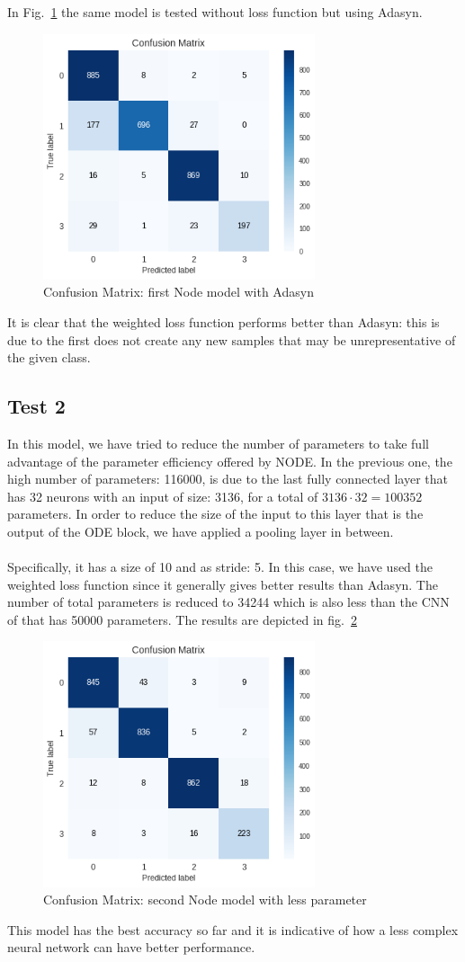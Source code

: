 \documentclass[LaM,binding=0.6cm]{sapthesis}
\begin{document}
In Fig.~\ref{fig:odetestada} the same model is tested without loss function but using Adasyn.
\begin{figure}   \centering
    \includegraphics[width=80mm,scale=0.7]{odetestada.png}
    \caption{Confusion Matrix: first Node model with Adasyn}
    \label{fig:odetestada}
\end{figure}
It is clear that the weighted loss function performs better than Adasyn: this is due to the first does not create any new samples that may be unrepresentative of the given class. 
\subsection{Test 2}
In this model, we have tried to reduce the number of parameters to take full advantage of the parameter efficiency offered by NODE. In the previous one, the high number of parameters: 116000, is due to the last fully connected layer that has 32 neurons with an input of size: 3136, for a total of $3136 \cdot 32 = 100352$ parameters. In order to reduce the size of the input to this layer that is the output of the ODE block, we have applied a pooling layer in between.\\\\Specifically, it has a size of 10 and as stride: 5. In this case, we have used the weighted loss function since it generally gives better results than Adasyn. The number of total parameters is reduced to 34244 which is also less than the CNN of \cite{cnnfazeli} that has 50000 parameters. The results are depicted in fig.~\ref{fig:odelp} 
\begin{figure}   \centering
    \includegraphics[width=80mm,scale=0.7]{odelp}
    \caption{Confusion Matrix: second Node model with less parameter}
    \label{fig:odelp}
\end{figure}
This model has the best accuracy so far and it is indicative of how a less complex neural network can have better performance.
\end{document}
